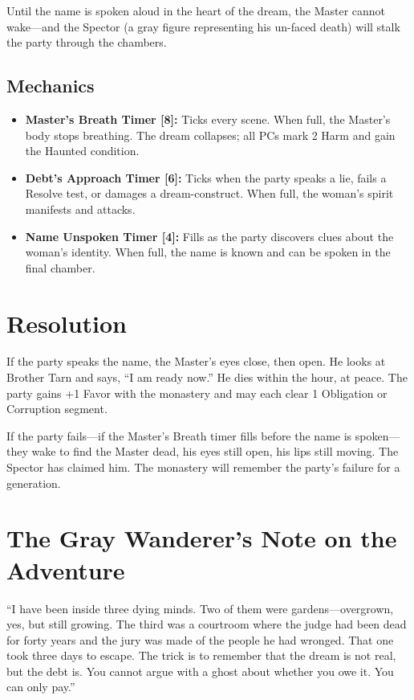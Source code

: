 \documentclass[11pt]{book}
\begin{document}
Until the name is spoken aloud in the heart of the dream, the Master cannot wake---and the Spector (a gray figure representing his un-faced death) will stalk the party through the chambers.

\subsection{Mechanics}

\begin{itemize}
    \item \textbf{Master's Breath Timer [8]:} Ticks every scene. When full, the Master's body stops breathing. The dream collapses; all PCs mark 2 Harm and gain the Haunted condition.
    \item \textbf{Debt's Approach Timer [6]:} Ticks when the party speaks a lie, fails a Resolve test, or damages a dream-construct. When full, the woman's spirit manifests and attacks.
    \item \textbf{Name Unspoken Timer [4]:} Fills as the party discovers clues about the woman's identity. When full, the name is known and can be spoken in the final chamber.
\end{itemize}

\section{Resolution}

If the party speaks the name, the Master's eyes close, then open. He looks at Brother Tarn and says, ``I am ready now.'' He dies within the hour, at peace. The party gains +1 Favor with the monastery and may each clear 1 Obligation or Corruption segment.

If the party fails---if the Master's Breath timer fills before the name is spoken---they wake to find the Master dead, his eyes still open, his lips still moving. The Spector has claimed him. The monastery will remember the party's failure for a generation.

\section{The Gray Wanderer's Note on the Adventure}

``I have been inside three dying minds. Two of them were gardens---overgrown, yes, but still growing. The third was a courtroom where the judge had been dead for forty years and the jury was made of the people he had wronged. That one took three days to escape. The trick is to remember that the dream is not real, but the debt is. You cannot argue with a ghost about whether you owe it. You can only pay.''
\end{document}
